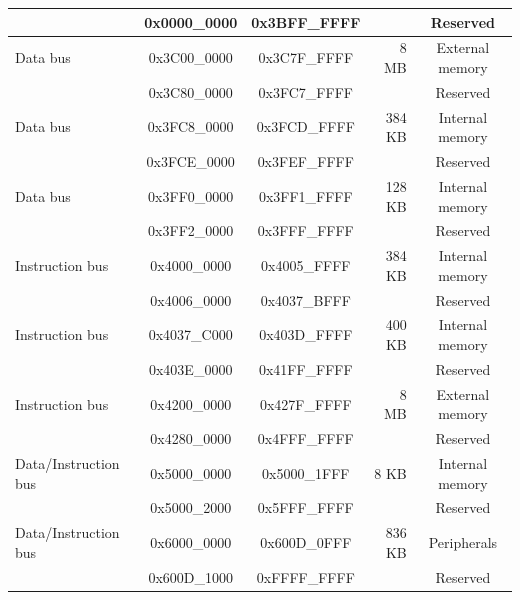 \begin{longtable}[c]{|p{4cm}|c|c|r|c|}
  \rowcolor{gray!25}                   & 0x0000\_0000 & 0x3BFF\_FFFF &         & Reserved        \\\hline
            Data bus                   & 0x3C00\_0000 & 0x3C7F\_FFFF &    8 MB & External memory \\\hline
  \rowcolor{gray!25}                   & 0x3C80\_0000 & 0x3FC7\_FFFF &         & Reserved        \\\hline
            Data bus                   & 0x3FC8\_0000 & 0x3FCD\_FFFF &  384 KB & Internal memory \\\hline
  \rowcolor{gray!25}                   & 0x3FCE\_0000 & 0x3FEF\_FFFF &         & Reserved        \\\hline
            Data bus                   & 0x3FF0\_0000 & 0x3FF1\_FFFF &  128 KB & Internal memory \\\hline
  \rowcolor{gray!25}                   & 0x3FF2\_0000 & 0x3FFF\_FFFF &         & Reserved        \\\hline
            Instruction bus            & 0x4000\_0000 & 0x4005\_FFFF &  384 KB & Internal memory \\\hline
  \rowcolor{gray!25}                   & 0x4006\_0000 & 0x4037\_BFFF &         & Reserved        \\\hline
            Instruction bus            & 0x4037\_C000 & 0x403D\_FFFF &  400 KB & Internal memory \\\hline
  \rowcolor{gray!25}                   & 0x403E\_0000 & 0x41FF\_FFFF &         & Reserved        \\\hline
            Instruction bus            & 0x4200\_0000 & 0x427F\_FFFF &    8 MB & External memory \\\hline
  \rowcolor{gray!25}                   & 0x4280\_0000 & 0x4FFF\_FFFF &         & Reserved        \\\hline
            Data/Instruction bus       & 0x5000\_0000 & 0x5000\_1FFF &    8 KB & Internal memory \\\hline
  \rowcolor{gray!25}                   & 0x5000\_2000 & 0x5FFF\_FFFF &         & Reserved        \\\hline
                 Data/Instruction bus  & 0x6000\_0000 & 0x600D\_0FFF &  836 KB & Peripherals    \\\hline
  \rowcolor{gray!25}                   & 0x600D\_1000 & 0xFFFF\_FFFF &         & Reserved        \\\hline

\end{longtable}
